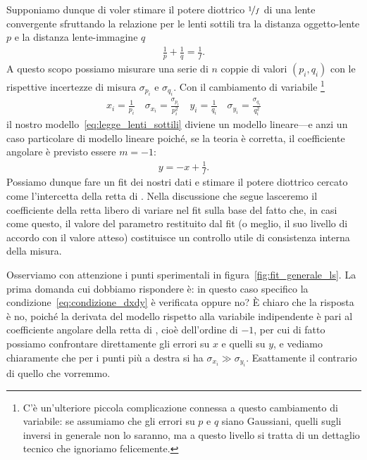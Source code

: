 Supponiamo dunque di voler stimare il potere diottrico $\nicefrac{1}{f}$ di
una lente convergente sfruttando la relazione per le lenti sottili tra la
distanza oggetto-lente $p$ e la distanza lente-immagine $q$
\begin{align}\label{eq:legge_lenti_sottili}
  \frac{1}{p} + \frac{1}{q} = \frac{1}{f}.
\end{align}
A questo scopo possiamo misurare una serie di $n$ coppie di valori $(p_i, q_i)$
con le rispettive incertezze di misura $\sigma_{p_i}$ e $\sigma_{q_i}$. Con il
cambiamento di variabile%
\footnote{C'è un'ulteriore piccola complicazione connessa a questo cambiamento
  di variabile: se assumiamo che gli errori su $p$ e $q$ siano Gaussiani,
  quelli sugli inversi in generale non lo saranno, ma a questo livello si tratta
  di un dettaglio tecnico che ignoriamo felicemente.}
\begin{align}
  x_i = \frac{1}{p_i} \quad \sigma_{x_i} = \frac{\sigma_{p_i}}{p_i^2} \quad
  y_i = \frac{1}{q_i} \quad \sigma_{y_i} = \frac{\sigma_{q_i}}{q_i^2}
\end{align}
il nostro modello~\eqref{eq:legge_lenti_sottili} diviene un modello
lineare---e anzi un caso particolare di modello lineare poiché, se la teoria
è corretta, il coefficiente angolare è previsto essere $m = -1$:
\begin{align*}
  y = -x + \frac{1}{f}.
\end{align*}
Possiamo dunque fare un fit dei nostri dati e stimare il potere diottrico
cercato come l'intercetta della retta di \bestfit. Nella discussione che
segue lasceremo il coefficiente della retta libero di variare nel fit sulla
base del fatto che, in casi come questo, il valore del parametro restituito dal
fit (o meglio, il suo livello di accordo con il valore atteso) costituisce un
controllo utile di consistenza interna della misura.


Osserviamo con attenzione i punti sperimentali in
figura~\ref{fig:fit_generale_ls}. La prima domanda cui dobbiamo rispondere è:
in questo caso specifico la condizione~\eqref{eq:condizione_dxdy} è verificata
oppure no? \`E chiaro che la risposta è no, poiché la derivata del modello
rispetto alla variabile indipendente è pari al coefficiente angolare della
retta di \bestfit, cioè dell'ordine di $-1$, per cui di fatto possiamo
confrontare direttamente gli errori su $x$ e quelli su $y$, e vediamo
chiaramente che per i punti più a destra si ha $\sigma_{x_i} \gg \sigma_{y_i}$.
Esattamente il contrario di quello che vorremmo.

